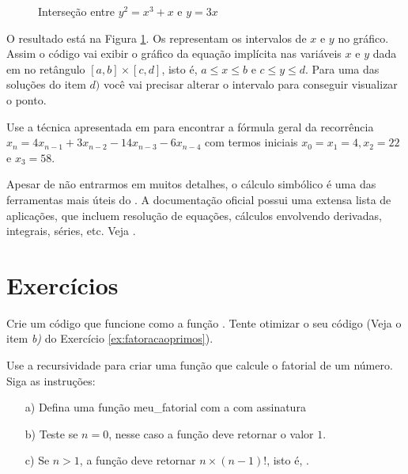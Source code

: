 \begin{exercise}
\begin{itemize}
\begin{figure}[h]
      \caption{Interseção entre $y^2 = x^3 + x$ e $y = 3x$}
      \label{img:cepoints}
    \end{figure}
  \end{itemize}
    O resultado está na Figura \ref{img:cepoints}. Os
     representam os intervalos de $x$ e $y$ no gráfico.
    Assim o código  vai
    exibir o gráfico da equação implícita nas variáveis $x$ e $y$
    dada em  no retângulo $[a,b]\times[c,d]$, isto é,
    $a\leq x \leq b$ e $c\leq y \leq d$.
    Para uma das soluções do item $d)$ você vai precisar
    alterar o intervalo para conseguir visualizar o ponto.
\end{exercise}

\begin{exercise} 
  Use a técnica apresentada em \cite[B.4]{tnumgugu} para 
  encontrar a fórmula geral da recorrência
  $x_n = 4x_{n-1} + 3x_{n-2} - 14x_{n-3} -6x_{n-4}$ com termos
  iniciais $x_0 = x_1 = 4, x_2 = 22$ e $x_3 = 58$.
\end{exercise}


Apesar de não entrarmos em muitos detalhes, o
cálculo simbólico é uma das ferramentas mais úteis do \sage. 
A documentação oficial possui uma extensa lista de
aplicações, que incluem resolução de equações, cálculos
envolvendo derivadas,
integrais, séries, etc. Veja \cite[Symbolic Calculus]{sagedoc}.




\section{Exercícios}
\begin{exercise} 
  Crie um código \sage que funcione como a função
  . Tente otimizar o seu código
  (Veja o item \textit{b)} do Exercício \ref{ex:fatoracaoprimos}).
\end{exercise}

\begin{exercise} 
  \label{ex:fatorial}
  Use a recursividade para criar uma função que calcule o fatorial de
  um número. Siga as instruções:
  \begin{itemize}
    \item[a)] Defina uma função meu\_fatorial com a
    com assinatura 
    \item[b)] Teste se $n = 0$, nesse caso a função
    deve retornar o valor $1$.
    \item[c)] Se $n>1$, a função deve retornar
    $n\times(n-1)!$, isto é,  .
  \end{itemize}
\end{exercise}

